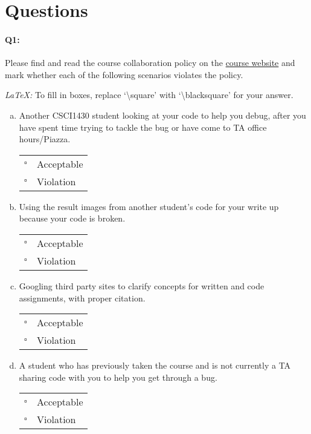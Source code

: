 \documentclass[11pt]{article}
\begin{document}
\section*{Questions}

\paragraph{Q1:} Please find and read the course collaboration policy on the \href{http://cs.brown.edu/courses/csci1430/}{course website} and mark whether each of the following scenarios violates the policy.

\emph{LaTeX:} To fill in boxes, replace `\textbackslash square' with `\textbackslash blacksquare' for your answer.

\begin{enumerate}[(a)]
\item
Another CSCI1430 student looking at your code to help you debug, after you have spent time trying to tackle the bug or have come to TA office hours/Piazza.

\begin{tabular}[h]{ll}
$\square$ & Acceptable \\
$\square$ & Violation \\
\end{tabular}

\item
Using the result images from another student's code for your write up because your code is broken.

\begin{tabular}[h]{ll}
$\square$ & Acceptable \\
$\square$ & Violation \\
\end{tabular}

\item
Googling third party sites to clarify concepts for written and code assignments, with proper citation.

\begin{tabular}[h]{ll}
$\square$ & Acceptable \\
$\square$ & Violation \\
\end{tabular}

\item
A student who has previously taken the course and is not currently a TA sharing code with you to help you get through a bug.

\begin{tabular}[h]{ll}
$\square$ & Acceptable \\
$\square$ & Violation \\
\end{tabular}

\end{enumerate}
\end{document}
